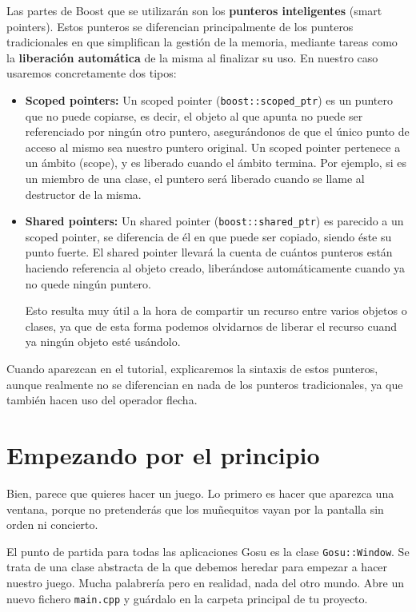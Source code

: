 \documentclass{article}
\begin{document}
Las partes de Boost que se utilizarán son los \textbf{punteros
  inteligentes} (smart pointers). Estos punteros se diferencian
principalmente de los punteros tradicionales en que simplifican la
gestión de la memoria, mediante tareas como la \textbf{liberación
  automática} de la misma al finalizar su uso. En nuestro caso
usaremos concretamente dos tipos:
\begin{itemize}
\item \textbf{Scoped pointers:} Un scoped pointer
  (\texttt{boost::scoped\_ptr}) es un puntero que no puede copiarse, es
  decir, el objeto al que apunta no puede ser referenciado por ningún
  otro puntero, asegurándonos de que el único punto de acceso al mismo
  sea nuestro puntero original. Un scoped pointer pertenece a un
  ámbito (scope), y es liberado cuando el ámbito termina. Por ejemplo,
  si es un miembro de una clase, el puntero será liberado cuando se
  llame al destructor de la misma.
\item \textbf{Shared pointers:} Un shared pointer
  (\texttt{boost::shared\_ptr}) es parecido a un scoped pointer, se
  diferencia de él en que puede ser copiado, siendo éste su punto
  fuerte. El shared pointer llevará la cuenta de cuántos punteros
  están haciendo referencia al objeto creado, liberándose
  automáticamente cuando ya no quede ningún puntero. 

  Esto resulta muy útil a la hora de compartir un recurso entre varios
  objetos o clases, ya que de esta forma podemos olvidarnos de liberar
  el recurso cuand ya ningún objeto esté usándolo.
\end{itemize}

Cuando aparezcan en el tutorial, explicaremos la sintaxis de estos
punteros, aunque realmente no se diferencian en nada de los punteros
tradicionales, ya que también hacen uso del operador flecha.

\section{Empezando por el principio}

Bien, parece que quieres hacer un juego. Lo primero es hacer que
aparezca una ventana, porque no pretenderás que los muñequitos vayan
por la pantalla sin orden ni concierto.

El punto de partida para todas las aplicaciones Gosu es la clase
\texttt{Gosu::Window}. Se trata de una clase abstracta de la que
debemos heredar para empezar a hacer nuestro juego. Mucha palabrería
pero en realidad, nada del otro mundo. Abre un nuevo fichero
\texttt{main.cpp} y guárdalo en la carpeta principal de tu proyecto.
\end{document}

